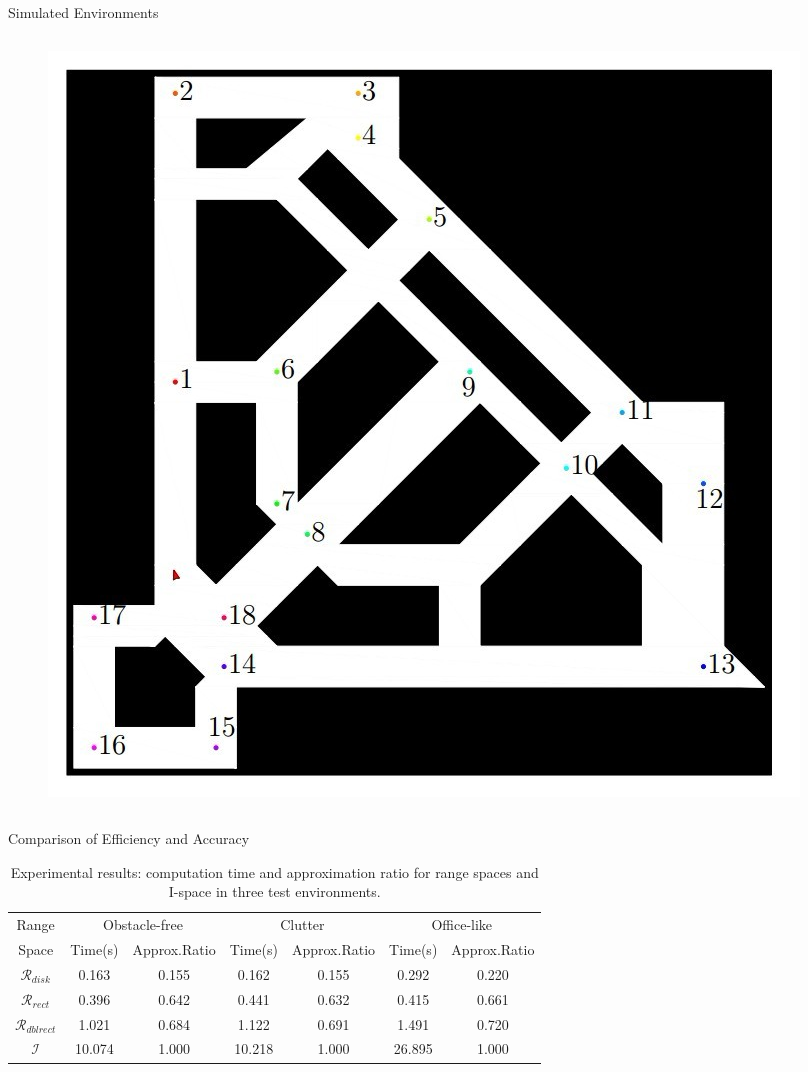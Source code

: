 \begin{frame}{Simulated Environments}
\begin{columns}
\begin{column}[b]{0.45\textwidth}
\begin{figure}
      \includegraphics[scale=0.25]{figs/office.jpg}    
    \end{figure}
  \end{column}
\end{columns}
\end{frame}

\begin{frame}{Comparison of Efficiency and Accuracy}
\begin{table}
  \scriptsize\centering
    \begin{tabular}{ccccccc} 
    \hline
    Range & \multicolumn{2}{c}{Obstacle-free} & \multicolumn{2}{c}{Clutter} & \multicolumn{2}{c}{Office-like}\\
    Space & Time(s) &Approx.Ratio& Time(s) &Approx.Ratio& Time(s) &Approx.Ratio \\
    \hline
    $\mathcal{R}_{disk}$ & 0.163 & 0.155 & 0.162 & 0.155  & 0.292 & 0.220 \\ 
    \hline
    $\mathcal{R}_{rect}$ & 0.396 & 0.642  & 0.441 & 0.632 & 0.415 & 0.661 \\
    \hline
    $\mathcal{R}_{dblrect}$ & 1.021 & 0.684 & 1.122 & 0.691 & 1.491 & 0.720 \\
    \hline
    $\mathcal{I}$ & 10.074 & 1.000 & 10.218 & 1.000 & 26.895 & 1.000 \\
    \hline
    \end{tabular}
    \caption{Experimental results: computation time and approximation
      ratio for range spaces and I-space in three test environments.}
    \label{tab:exp-data}
\end{table}
\end{frame}

